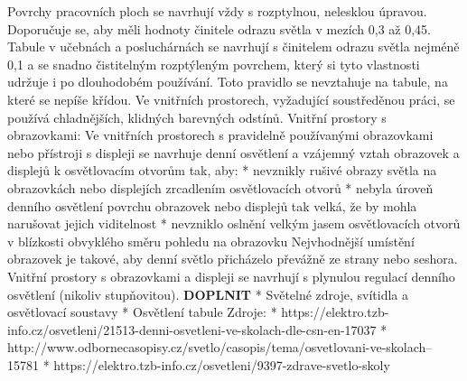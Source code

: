 Povrchy pracovních ploch se navrhují vždy s rozptylnou, nelesklou úpravou. Doporučuje se, aby měli hodnoty činitele odrazu světla v mezích 0,3 až 0,45.
\medskip
Tabule v učebnách a posluchárnách se navrhují s činitelem odrazu světla nejméně 0,1 a se snadno čistitelným rozptýleným povrchem, který si tyto vlastnosti udržuje i po dlouhodobém používání. Toto pravidlo se nevztahuje na tabule, na které se nepíše křídou.
\medskip
Ve vnitřních prostorech, vyžadující soustředěnou práci, se používá chladnějších, klidných barevných odstínů.
\medskip
Vnitřní prostory s obrazovkami:
\medskip
Ve vnitřních prostorech s pravidelně používanými obrazovkami nebo přístroji s displeji se navrhuje denní osvětlení a vzájemný vztah obrazovek a displejů k osvětlovacím otvorům tak, aby:
\medskip
\begitems
    * nevznikly rušivé obrazy světla na obrazovkách nebo displejích zrcadlením osvětlovacích otvorů
    * nebyla úroveň denního osvětlení povrchu obrazovek nebo displejů tak velká, že by mohla narušovat jejich viditelnost
    * nevzniklo oslnění velkým jasem osvětlovacích otvorů v blízkosti obvyklého směru pohledu na obrazovku
\enditems
\medskip
Nejvhodnější umístění obrazovek je takové, aby denní světlo přicházelo převážně ze strany nebo seshora.
\medskip
Vnitřní prostory s obrazovkami a displeji se navrhují s plynulou regulací denního osvětlení (nikoliv stupňovitou).
\medskip
{\bf DOPLNIT}
\begitems
* Světelné zdroje, svítidla a osvětlovací soustavy
* Osvětlení tabule
\enditems
\medskip
{\sbf Zdroje:}
\begitems
* https://elektro.tzb-info.cz/osvetleni/21513-denni-osvetleni-ve-skolach-dle-csn-en-17037
* http://www.odbornecasopisy.cz/svetlo/casopis/tema/osvetlovani-ve-skolach--15781
* https://elektro.tzb-info.cz/osvetleni/9397-zdrave-svetlo-skoly
\enditems





